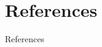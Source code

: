 \documentclass[8pt, aspectratio=169]{beamer}
\begin{document}
%
%
%

% 

% 

\section{References}
\begin{frame}[allowframebreaks]{References}
    \nocite{*}
    \scriptsize
    \printbibliography
\end{frame}
\end{document}
